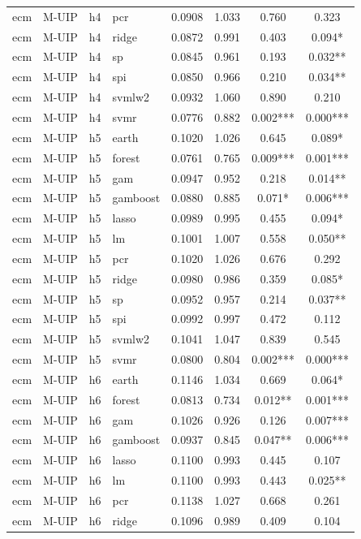 \begin{ThreePartTable}
\begin{longtable}[t]{llclcccc}
ecm & M-UIP & h4 & pcr & 0.0908 & 1.033 & 0.760 & 0.323\\
ecm & M-UIP & h4 & ridge & 0.0872 & 0.991 & 0.403 & 0.094*\\
ecm & M-UIP & h4 & sp & 0.0845 & 0.961 & 0.193 & 0.032**\\
ecm & M-UIP & h4 & spi & 0.0850 & 0.966 & 0.210 & 0.034**\\
ecm & M-UIP & h4 & svmlw2 & 0.0932 & 1.060 & 0.890 & 0.210\\
ecm & M-UIP & h4 & svmr & 0.0776 & 0.882 & 0.002*** & 0.000***\\
\addlinespace
ecm & M-UIP & h5 & earth & 0.1020 & 1.026 & 0.645 & 0.089*\\
ecm & M-UIP & h5 & forest & 0.0761 & 0.765 & 0.009*** & 0.001***\\
ecm & M-UIP & h5 & gam & 0.0947 & 0.952 & 0.218 & 0.014**\\
ecm & M-UIP & h5 & gamboost & 0.0880 & 0.885 & 0.071* & 0.006***\\
ecm & M-UIP & h5 & lasso & 0.0989 & 0.995 & 0.455 & 0.094*\\
ecm & M-UIP & h5 & lm & 0.1001 & 1.007 & 0.558 & 0.050**\\
ecm & M-UIP & h5 & pcr & 0.1020 & 1.026 & 0.676 & 0.292\\
ecm & M-UIP & h5 & ridge & 0.0980 & 0.986 & 0.359 & 0.085*\\
ecm & M-UIP & h5 & sp & 0.0952 & 0.957 & 0.214 & 0.037**\\
ecm & M-UIP & h5 & spi & 0.0992 & 0.997 & 0.472 & 0.112\\
ecm & M-UIP & h5 & svmlw2 & 0.1041 & 1.047 & 0.839 & 0.545\\
ecm & M-UIP & h5 & svmr & 0.0800 & 0.804 & 0.002*** & 0.000***\\
\addlinespace
ecm & M-UIP & h6 & earth & 0.1146 & 1.034 & 0.669 & 0.064*\\
ecm & M-UIP & h6 & forest & 0.0813 & 0.734 & 0.012** & 0.001***\\
ecm & M-UIP & h6 & gam & 0.1026 & 0.926 & 0.126 & 0.007***\\
ecm & M-UIP & h6 & gamboost & 0.0937 & 0.845 & 0.047** & 0.006***\\
ecm & M-UIP & h6 & lasso & 0.1100 & 0.993 & 0.445 & 0.107\\
ecm & M-UIP & h6 & lm & 0.1100 & 0.993 & 0.443 & 0.025**\\
ecm & M-UIP & h6 & pcr & 0.1138 & 1.027 & 0.668 & 0.261\\
ecm & M-UIP & h6 & ridge & 0.1096 & 0.989 & 0.409 & 0.104\\

\end{longtable}
\end{ThreePartTable}

